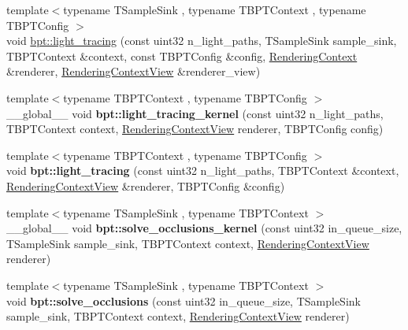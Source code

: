 \begin{DoxyCompactItemize}
\item 
{\footnotesize template$<$typename T\+Sample\+Sink , typename T\+B\+P\+T\+Context , typename T\+B\+P\+T\+Config $>$ }\\void \hyperlink{group___b_p_t_lib_ga497e0940986e5f948a9dcf42242d39c7}{bpt\+::light\+\_\+tracing} (const uint32 n\+\_\+light\+\_\+paths, T\+Sample\+Sink sample\+\_\+sink, T\+B\+P\+T\+Context \&context, const T\+B\+P\+T\+Config \&config, \hyperlink{struct_rendering_context}{Rendering\+Context} \&renderer, \hyperlink{struct_rendering_context_view}{Rendering\+Context\+View} \&renderer\+\_\+view)
\item 
\mbox{\label{group___b_p_t_lib_ga97d1d774b28d0420e8f84d68b9c17adb}} 
{\footnotesize template$<$typename T\+B\+P\+T\+Context , typename T\+B\+P\+T\+Config $>$ }\\\+\_\+\+\_\+global\+\_\+\+\_\+ void {\bfseries bpt\+::light\+\_\+tracing\+\_\+kernel} (const uint32 n\+\_\+light\+\_\+paths, T\+B\+P\+T\+Context context, \hyperlink{struct_rendering_context_view}{Rendering\+Context\+View} renderer, T\+B\+P\+T\+Config config)
\item 
\mbox{\label{group___b_p_t_lib_gad446148ae3c46cee02413d0e567fa666}} 
{\footnotesize template$<$typename T\+B\+P\+T\+Context , typename T\+B\+P\+T\+Config $>$ }\\void {\bfseries bpt\+::light\+\_\+tracing} (const uint32 n\+\_\+light\+\_\+paths, T\+B\+P\+T\+Context \&context, \hyperlink{struct_rendering_context_view}{Rendering\+Context\+View} \&renderer, T\+B\+P\+T\+Config \&config)
\item 
\mbox{\label{group___b_p_t_lib_ga323f0d4f0454ac39cd6355fdca67314c}} 
{\footnotesize template$<$typename T\+Sample\+Sink , typename T\+B\+P\+T\+Context $>$ }\\\+\_\+\+\_\+global\+\_\+\+\_\+ void {\bfseries bpt\+::solve\+\_\+occlusions\+\_\+kernel} (const uint32 in\+\_\+queue\+\_\+size, T\+Sample\+Sink sample\+\_\+sink, T\+B\+P\+T\+Context context, \hyperlink{struct_rendering_context_view}{Rendering\+Context\+View} renderer)
\item 
\mbox{\label{group___b_p_t_lib_ga15de63ef1e71caf7a59628ed1f6ba2e5}} 
{\footnotesize template$<$typename T\+Sample\+Sink , typename T\+B\+P\+T\+Context $>$ }\\void {\bfseries bpt\+::solve\+\_\+occlusions} (const uint32 in\+\_\+queue\+\_\+size, T\+Sample\+Sink sample\+\_\+sink, T\+B\+P\+T\+Context context, \hyperlink{struct_rendering_context_view}{Rendering\+Context\+View} renderer)

\end{DoxyCompactItemize}
